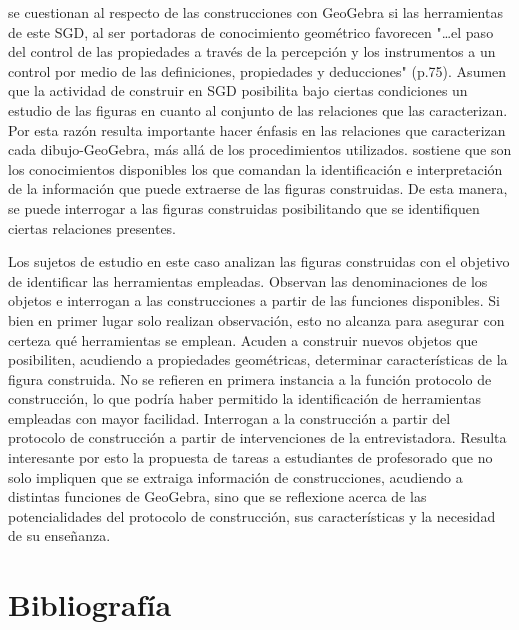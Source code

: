 \documentclass[oneside,spanish]{amsart}
\numberwithin{equation}{section}
\numberwithin{figure}{section}
\theoremstyle{definition}
\begin{document}
\citet{itzcovich16} se cuestionan al respecto de las construcciones con GeoGebra si las herramientas de este SGD, al ser portadoras de conocimiento geométrico favorecen "…el paso del control de las propiedades a través de la percepción y los instrumentos a un control por medio de las definiciones, propiedades y deducciones" (p.75). Asumen que la actividad de construir en SGD posibilita bajo ciertas condiciones un estudio de las figuras en cuanto al conjunto de las relaciones que las caracterizan. Por esta razón resulta importante hacer énfasis en las relaciones que caracterizan cada dibujo-GeoGebra, más allá de los procedimientos utilizados. \citet{itzcovich20} sostiene que son los conocimientos disponibles los que comandan la identificación e interpretación de la información que puede extraerse de las figuras construidas. De esta manera, se puede interrogar a las figuras construidas posibilitando que se identifiquen ciertas relaciones presentes.

Los sujetos de estudio en este caso analizan las figuras construidas con el objetivo de identificar las herramientas empleadas. Observan las denominaciones de los objetos e interrogan a las construcciones a partir de las funciones disponibles. Si bien en primer lugar solo realizan observación, esto no alcanza para asegurar con certeza qué herramientas se emplean. Acuden a construir nuevos objetos que posibiliten, acudiendo a propiedades geométricas, determinar características de la figura construida. No se refieren en primera instancia a la función protocolo de construcción, lo que podría haber permitido la identificación de herramientas empleadas con mayor facilidad. Interrogan a la construcción a partir del protocolo de construcción a partir de intervenciones de la entrevistadora. Resulta interesante por esto la propuesta de tareas a estudiantes de profesorado que no solo impliquen que se extraiga información de construcciones, acudiendo a distintas funciones de GeoGebra, sino que se reflexione acerca de las potencialidades del protocolo de construcción, sus características y la necesidad de su enseñanza.

\section{Bibliografía}

\nocite{*}
\printbibliography
\end{document}
